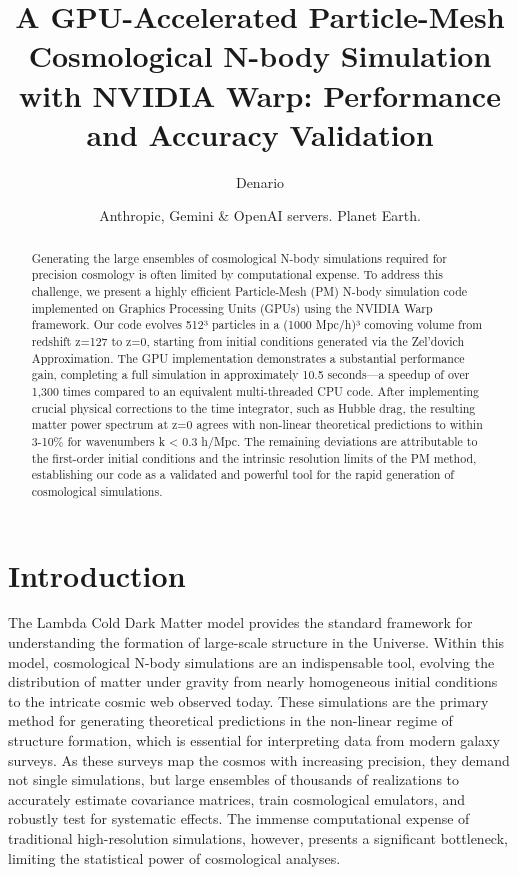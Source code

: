\documentclass[]{article}
\begin{document}
\title{A GPU-Accelerated Particle-Mesh Cosmological N-body Simulation with NVIDIA Warp: Performance and Accuracy Validation}

\author{Denario}
\date{Anthropic, Gemini \& OpenAI servers. Planet Earth.}

\maketitle
\begin{abstract}
Generating the large ensembles of cosmological N-body simulations required for precision cosmology is often limited by computational expense. To address this challenge, we present a highly efficient Particle-Mesh (PM) N-body simulation code implemented on Graphics Processing Units (GPUs) using the NVIDIA Warp framework. Our code evolves 512³ particles in a (1000 Mpc/h)³ comoving volume from redshift z=127 to z=0, starting from initial conditions generated via the Zel'dovich Approximation. The GPU implementation demonstrates a substantial performance gain, completing a full simulation in approximately 10.5 seconds—a speedup of over 1,300 times compared to an equivalent multi-threaded CPU code. After implementing crucial physical corrections to the time integrator, such as Hubble drag, the resulting matter power spectrum at z=0 agrees with non-linear theoretical predictions to within 3-10\% for wavenumbers k < 0.3 h/Mpc. The remaining deviations are attributable to the first-order initial conditions and the intrinsic resolution limits of the PM method, establishing our code as a validated and powerful tool for the rapid generation of cosmological simulations.
\end{abstract}








\section{Introduction}
\label{sec:intro}
The Lambda Cold Dark Matter model provides the standard framework for understanding the formation of large-scale structure in the Universe. Within this model, cosmological N-body simulations are an indispensable tool, evolving the distribution of matter under gravity from nearly homogeneous initial conditions to the intricate cosmic web observed today. These simulations are the primary method for generating theoretical predictions in the non-linear regime of structure formation, which is essential for interpreting data from modern galaxy surveys. As these surveys map the cosmos with increasing precision, they demand not single simulations, but large ensembles of thousands of realizations to accurately estimate covariance matrices, train cosmological emulators, and robustly test for systematic effects. The immense computational expense of traditional high-resolution simulations, however, presents a significant bottleneck, limiting the statistical power of cosmological analyses.
\end{document}
